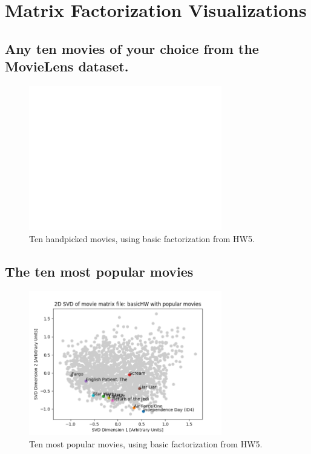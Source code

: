 \section{Matrix Factorization Visualizations}

\subsection{Any ten movies of your choice from the MovieLens dataset.}
    \begin{figure}[H]
    \centering
    \includegraphics[width=0.75\textwidth]{../Figures/fig1.png}
    \caption{Ten handpicked movies, using basic factorization from HW5.}
    \end{figure}

\subsection{The ten most popular movies}    
    \begin{figure}[H]
    \centering
    \includegraphics[width=0.75\textwidth]{../Figures/fig2.png}
    \caption{Ten most popular movies, using basic factorization from HW5.}
    \end{figure}

